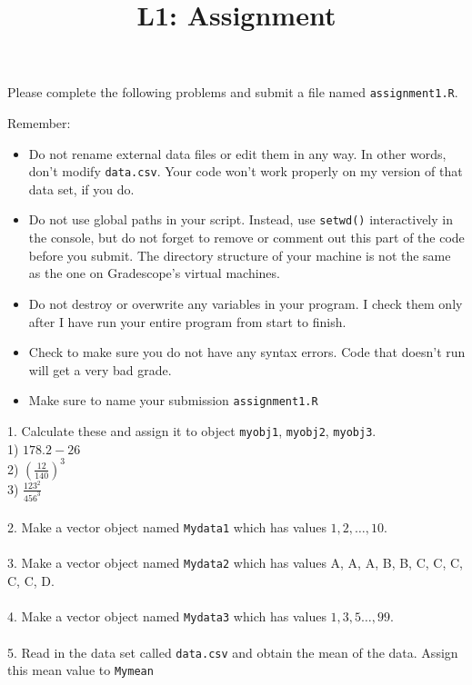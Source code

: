 \documentclass[11pt]{amsart}
\title{L1: Assignment }
\author{}
\begin{document}
\maketitle

Please complete the following problems and submit a file named \verb|assignment1.R|.
\newline

Remember:
\begin{itemize}
\item Do not rename external data files or edit them in any way. In other words, don't modify \verb|data.csv|. Your code won't work properly on my version of that data set, if you do.
\item Do not use global paths in your script. Instead, use \verb|setwd()| interactively in the console, but do not forget to remove or comment out this part of the code before you submit. The directory structure of your machine is not the same as the one on Gradescope's virtual machines.
\item Do not destroy or overwrite any variables in your program. I check them only after I have run your entire program from start to finish.
\item Check to make sure you do not have any syntax errors. Code that doesn't run will get a very bad grade. 
\item Make sure to name your submission \verb|assignment1.R|
\end{itemize} 



1. Calculate these and assign it to object \verb|myobj1|, \verb|myobj2|, \verb|myobj3|. \\

1) $178.2 - 26$ \\

2) $(\frac{12}{140})^{3}$\\ 

3) $\frac{123^2}{456^3}$\\ \\


2. Make a vector object named \verb|Mydata1| which has values $1,2, \dots, 10$. \\ \\

3. Make a vector object named \verb|Mydata2| which has values A, A, A, B, B, C, C, C, C, C, D.\\ \\ 

4. Make a vector object named \verb|Mydata3| which has values $1,3, 5\dots, 99$. \\ \\

5. Read in the data set called \verb|data.csv| and obtain the mean of the data. Assign this mean value to \verb|Mymean|

\end{document}
